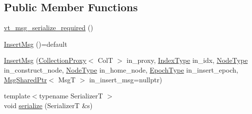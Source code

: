 \subsection*{Public Member Functions}
\begin{DoxyCompactItemize}
\item 
\hyperlink{structvt_1_1vrt_1_1collection_1_1_insert_msg_a8904f76e0a2b435aa26ff923e4118009}{vt\+\_\+msg\+\_\+serialize\+\_\+required} ()
\item 
\hyperlink{structvt_1_1vrt_1_1collection_1_1_insert_msg_a2a1c9b09db00dd3ec8cd54ff994401f7}{Insert\+Msg} ()=default
\item 
\hyperlink{structvt_1_1vrt_1_1collection_1_1_insert_msg_a2df48d0777f98f268beee283f1bbd840}{Insert\+Msg} (\hyperlink{structvt_1_1vrt_1_1collection_1_1_collection_proxy}{Collection\+Proxy}$<$ ColT $>$ in\+\_\+proxy, \hyperlink{structvt_1_1vrt_1_1collection_1_1_insert_msg_a6d0f0e849ba09859a0cda3e4785de16b}{Index\+Type} in\+\_\+idx, \hyperlink{namespacevt_a866da9d0efc19c0a1ce79e9e492f47e2}{Node\+Type} in\+\_\+construct\+\_\+node, \hyperlink{namespacevt_a866da9d0efc19c0a1ce79e9e492f47e2}{Node\+Type} in\+\_\+home\+\_\+node, \hyperlink{namespacevt_a81d11b28122d43bf9834577e4a06440f}{Epoch\+Type} in\+\_\+insert\+\_\+epoch, \hyperlink{namespacevt_ab2b3d506ec8e8d1540aede826d84a239}{Msg\+Shared\+Ptr}$<$ MsgT $>$ in\+\_\+insert\+\_\+msg=nullptr)
\item 
{\footnotesize template$<$typename SerializerT $>$ }\\void \hyperlink{structvt_1_1vrt_1_1collection_1_1_insert_msg_ac55e25383969b7d021b68e6062974a6d}{serialize} (SerializerT \&s)
\end{DoxyCompactItemize}
